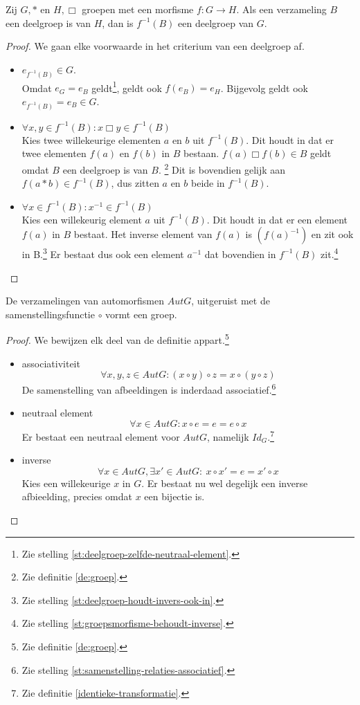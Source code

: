 \documentclass[main.tex]{subfiles}
\begin{document}
\begin{st}
  Zij $G,*$ en $H,\Box$ groepen met een morfisme $f: G \rightarrow H$.
  Als een verzameling $B$ een deelgroep is van $H$, dan is $f^{-1}(B)$ een deelgroep van $G$.

  \begin{proof}
    We gaan elke voorwaarde in het criterium van een deelgroep af.
    \begin{itemize}
    \item $e_{f^{-1}(B)} \in G$.\\
      Omdat $e_{G} = e_{B}$ geldt\footnote{Zie stelling \ref{st:deelgroep-zelfde-neutraal-element}.}, geldt ook $f(e_{B}) = e_{H}$.
      Bijgevolg geldt ook $e_{f^{-1}(B)} = e_{B} \in G$. 
    \item $\forall x,y \in f^{-1}(B): x \Box y \in f^{-1}(B) $\\
      Kies twee willekeurige elementen $a$ en $b$ uit $f^{-1}(B)$.
      Dit houdt in dat er twee elementen $f(a)$ en $f(b)$ in $B$ bestaan.
      $f(a) \Box f(b) \in B$ geldt omdat $B$ een deelgroep is van $B$. \footnote{Zie definitie \ref{de:groep}.}
      Dit is bovendien gelijk aan $f(a * b) \in f^{-1}(B)$, dus zitten $a$ en $b$ beide in $f^{-1}(B)$.
    \item $\forall x \in f^{-1}(B): x^{-1} \in f^{-1}(B)$\\
      Kies een willekeurig element $a$ uit $f^{-1}(B)$.
      Dit houdt in dat er een element $f(a)$ in $B$ bestaat.
      Het inverse element van $f(a)$ is $(f(a)^{-1})$ en zit ook in B.\footnote{Zie stelling \ref{st:deelgroep-houdt-invers-ook-in}.}
      Er bestaat dus ook een element $a^{-1}$ dat bovendien in $f^{-1}(B)$ zit.\footnote{Zie stelling \ref{st:groepsmorfisme-behoudt-inverse}.}
    \end{itemize}
  \end{proof}
\end{st}


\begin{st}
  De verzamelingen van automorfismen $Aut G$, uitgeruist met de samenstellingsfunctie $\circ$ vormt een groep.

  \begin{proof}
    We bewijzen elk deel van de definitie appart.\footnote{Zie definitie \ref{de:groep}.}
    \begin{itemize}
    \item associativiteit
      \[ \forall x, y, z \in Aut G: (x \circ y) \circ z = x \circ (y \circ z) \] 
      De samenstelling van afbeeldingen is inderdaad associatief.\footnote{Zie stelling \ref{st:samenstelling-relaties-associatief}.}
    \item neutraal element
      \[ \forall x \in Aut G: x \circ e = e = e \circ x \]
      Er bestaat een neutraal element voor $Aut G$, namelijk $Id_{G}$.\footnote{Zie definitie \ref{identieke-transformatie}.}
    \item inverse
      \[ \forall x \in Aut G, \exists x' \in Aut G:\ x \circ x' = e = x' \circ x \]
      Kies een willekeurige $x$ in $G$. Er bestaat nu wel degelijk een inverse afbieelding, precies omdat $x$ een bijectie is.
    \end{itemize}
  \end{proof}
\end{st}
\end{document}
